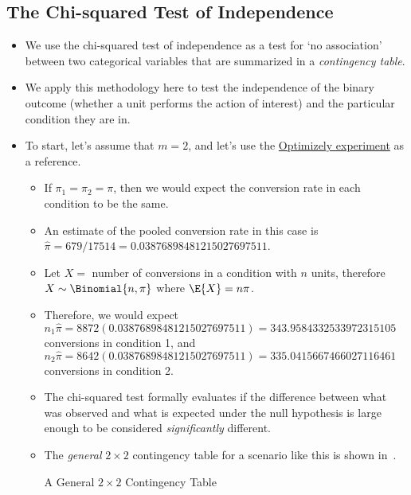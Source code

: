 \subsection{The Chi-squared Test of Independence}
\begin{itemize}
      \item We use the chi-squared test of independence as a test for `no association'
            between two categorical variables that are summarized in a \emph{contingency table}.
      \item We apply this methodology here to test the independence of the binary outcome
            (whether a unit performs the action of interest) and the particular condition they are in.
      \item To start, let's assume that $ m=2 $, and let's use the \hyperref[ex:optimizely_ex1]{Optimizely experiment} as a reference.
            \begin{itemize}
                  \item If $ \pi_1=\pi_2=\pi $, then we would expect the conversion rate in each condition to be the same.
                  \item An estimate of the pooled conversion rate in this case is $ \hat{\pi}=679/17514=\num{0.03876898481215027697511} $.
                  \item Let $ X= $ number of conversions in a condition with $ n $ units, therefore $ X \sim \Binomial{n,\pi} $
                        where $ \E{X}=n\pi $.
                  \item Therefore, we would expect $ n_1\hat{\pi}=8872(\num{0.03876898481215027697511})=\num{343.9584332533972315105} $ conversions in condition 1,
                        and $ n_2\hat{\pi}=8642(\num{0.03876898481215027697511})=\num{335.0415667466027116461} $ conversions in condition 2.
                  \item The chi-squared test formally evaluates if the difference between what
                        was observed and what is expected under the null hypothesis is large enough
                        to be considered \emph{significantly} different.
                  \item The \emph{general} $ 2\times 2 $ contingency table for a scenario like this
                        is shown in~.
                        \begin{table}[!htbp]
                              \centering
                              \caption{A General $ 2\times 2 $ Contingency Table}\label{general_22_contingency}

\end{table}
\end{itemize}
\end{itemize}
